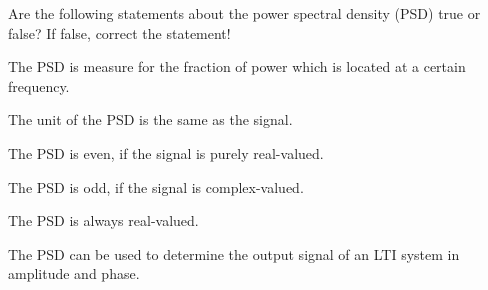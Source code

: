 \begin{question}[subtitle={Power Spectral Density}]
	Are the following statements about the power spectral density (PSD) true or false? If false, correct the statement!
	\begin{tasks}
		\task
		The PSD is measure for the fraction of power which is located at a certain frequency.
		
		\task
		The unit of the PSD is the same as the signal.
		
		\task
		The PSD is even, if the signal is purely real-valued.
		
		\task
		The PSD is odd, if the signal is complex-valued.
		
		\task
		The PSD is always real-valued.
		
		\task
		The PSD can be used to determine the output signal of an LTI system in amplitude and phase.
		
	\end{tasks}
\end{question}

